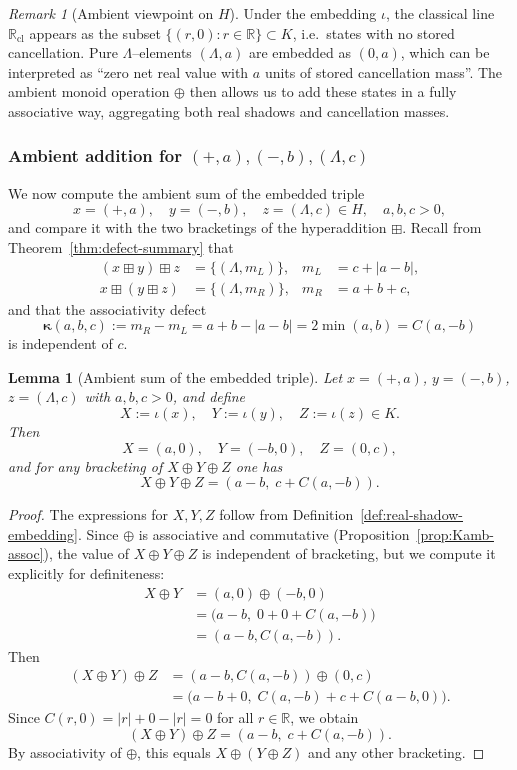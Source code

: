 \documentclass[11pt]{amsart}
\numberwithin{equation}{section}
\newtheorem{lemma}[theorem]{Lemma}
\theoremstyle{definition}
\theoremstyle{remark}
\newtheorem{remark}[theorem]{Remark}
\newcommand{\R}{\mathbb{R}}
\newcommand{\Rc}{\mathbb{R}_{\mathrm{cl}}} %
\newcommand{\Hnum}{H}                      %
\newcommand{\AssocCurv}{\boldsymbol{\kappa}} %
\newcommand{\Kamb}{K}                      %
\newcommand{\op}{\boxplus}                 %
\newcommand{\Cfun}{C}                      %
\begin{document}
\begin{remark}[Ambient viewpoint on $\Hnum$]\label{rem:iota-intuition}
Under the embedding $\iota$, the classical line $\Rc$ appears as the
subset $\{(r,0):r\in\R\}\subset\Kamb$, i.e.\ states with no stored
cancellation.  Pure $\Lambda$--elements $(\Lambda,a)$ are embedded as
$(0,a)$, which can be interpreted as ``zero net real value with $a$
units of stored cancellation mass''.  The ambient monoid operation
$\oplus$ then allows us to add these states in a fully associative
way, aggregating both real shadows and cancellation masses.
\end{remark}

\subsubsection*{Ambient addition for $(+,a),(-,b),(\Lambda,c)$}

We now compute the ambient sum of the embedded triple
\[
  x=(+,a),\quad y=(-,b),\quad z=(\Lambda,c)\in\Hnum,
  \quad a,b,c>0,
\]
and compare it with the two bracketings of the hyperaddition $\op$.
Recall from Theorem~\ref{thm:defect-summary} that
\begin{align*}
  (x\op y)\op z
  &= \{(\Lambda,m_L)\},
  & m_L &= c+|a-b|,\\
  x\op(y\op z)
  &= \{(\Lambda,m_R)\},
  & m_R &= a+b+c,
\end{align*}
and that the associativity defect
\[
  \AssocCurv(a,b,c)
  := m_R-m_L
  = a+b-|a-b|
  = 2\min(a,b)
  = \Cfun(a,-b)
\]
is independent of $c$.

\begin{lemma}[Ambient sum of the embedded triple]\label{lem:ambient-sum-triple}
Let $x=(+,a)$, $y=(-,b)$, $z=(\Lambda,c)$ with $a,b,c>0$, and define
\[
  X := \iota(x),\quad Y := \iota(y),\quad Z := \iota(z)\in\Kamb.
\]
Then
\[
  X = (a,0),\quad Y=(-b,0),\quad Z=(0,c),
\]
and for any bracketing of $X\oplus Y\oplus Z$ one has
\[
  X\oplus Y\oplus Z
  = (a-b,\; c+\Cfun(a,-b)).
\]
\end{lemma}

\begin{proof}
The expressions for $X,Y,Z$ follow from
Definition~\ref{def:real-shadow-embedding}.  Since $\oplus$ is
associative and commutative (Proposition~\ref{prop:Kamb-assoc}), the
value of $X\oplus Y\oplus Z$ is independent of bracketing, but we
compute it explicitly for definiteness:
\begin{align*}
  X\oplus Y
  &= (a,0)\oplus(-b,0)\\
  &= \bigl(a-b,\; 0+0+\Cfun(a,-b)\bigr)\\
  &= (a-b,\Cfun(a,-b)).
\end{align*}
Then
\begin{align*}
  (X\oplus Y)\oplus Z
  &= (a-b,\Cfun(a,-b))\oplus(0,c)\\
  &= \bigl(a-b+0,\;
           \Cfun(a,-b)+c+\Cfun(a-b,0)\bigr).
\end{align*}
Since $\Cfun(r,0)=|r|+0-|r|=0$ for all $r\in\R$, we obtain
\[
  (X\oplus Y)\oplus Z
  = (a-b,\; c+\Cfun(a,-b)).
\]
By associativity of $\oplus$, this equals $X\oplus(Y\oplus Z)$ and any
other bracketing.
\end{proof}
\end{document}
